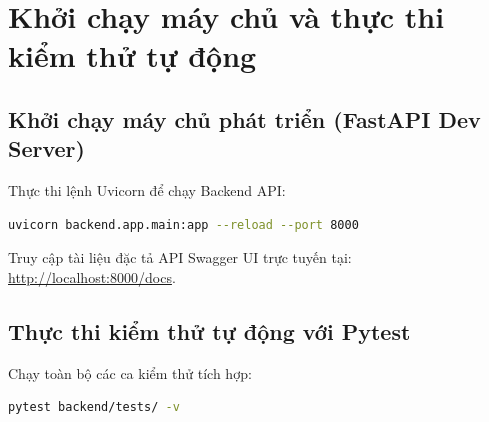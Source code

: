 \section{Khởi chạy máy chủ và thực thi kiểm thử tự động}

\subsection{Khởi chạy máy chủ phát triển (FastAPI Dev Server)}
Thực thi lệnh Uvicorn để chạy Backend API:
\begin{lstlisting}[language=bash, caption={Lệnh khởi chạy máy chủ FastAPI}]
uvicorn backend.app.main:app --reload --port 8000
\end{lstlisting}
Truy cập tài liệu đặc tả API Swagger UI trực tuyến tại: \url{http://localhost:8000/docs}.

\subsection{Thực thi kiểm thử tự động với Pytest}
Chạy toàn bộ các ca kiểm thử tích hợp:
\begin{lstlisting}[language=bash, caption={Lệnh chạy kiểm thử tự động}]
pytest backend/tests/ -v
\end{lstlisting}
